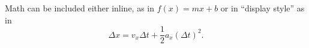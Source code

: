 Math can be included either inline, as in $f(x) = mx + b$ or in ``display style'' as in \[ \Delta x = v_x \Delta t + \frac{1}{2} a_x (\Delta t)^2. \]
